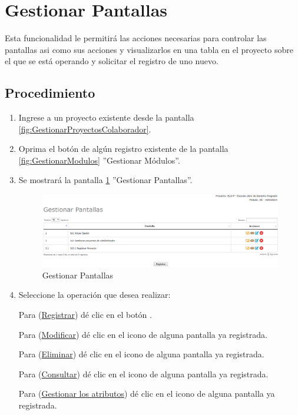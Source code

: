 \hypertarget{cv:gestionarPantallas}{\section{Gestionar Pantallas}} \label{sec:GestionarPantallas}

	Esta funcionalidad le permitirá las acciones necesarias para controlar las pantallas asi como sus acciones y visualizarlos en una tabla en el proyecto sobre el que se está operando y solicitar el registro de uno nuevo.

		\subsection{Procedimiento}

			\begin{enumerate}
				
			\item Ingrese a un proyecto existente desde la pantalla \ref{fig:GestionarProyectosColaborador}.
	
			\item Oprima el botón \IUPantallas{} de algún registro existente de la pantalla \ref{fig:GestionarModulos} ''Gestionar Módulos''.
	
			\item Se mostrará la pantalla \ref{fig:GestionarPantallas} ''Gestionar Pantallas''.

			\begin{figure}[h!]
				\begin{center}
					\includegraphics[scale=0.5]{roles/lider/pantallas/pantallas/IU11gestionarPantallas}
					\caption{Gestionar Pantallas}
					\label{fig:GestionarPantallas}
				\end{center}
			\end{figure}
		
				\item Seleccione la operación que desea realizar:
			
			Para (\hyperlink{cv:registrarPantalla}{Registrar}) dé clic en el botón \IURegistrar.
			
			Para (\hyperlink{cv:modificarPantalla}{Modificar}) dé clic en el icono \IUEditar{} de alguna pantalla ya registrada.
			
			Para (\hyperlink{cv:eliminarPantalla}{Eliminar}) dé clic en el icono \IUBotonEliminar{} de alguna pantalla ya registrada.
			
			Para (\hyperlink{cv:consultarPantalla}{Consultar}) dé clic en el icono \IUConsultar{} de alguna pantalla ya registrada.
			
			Para (\hyperlink{cv:gestionarAcciones}{Gestionar los atributos}) dé clic en el icono \IUAcciones{} de alguna pantalla ya registrada.
			\end{enumerate}